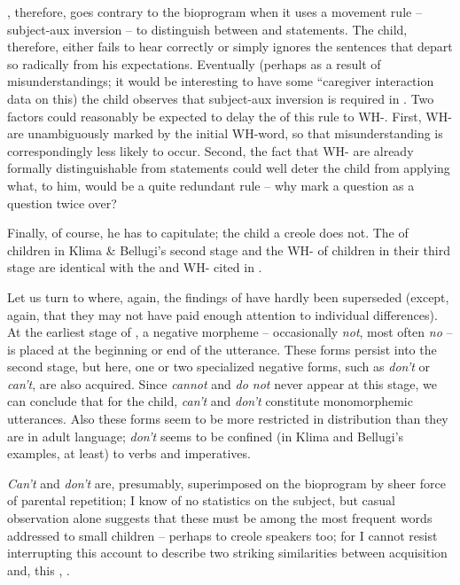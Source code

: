 , therefore, goes contrary to the bioprogram when it uses a movement rule -- subject-aux inversion -- to distinguish between  and statements. The child, therefore, either fails to hear correctly or simply ignores the sentences that depart so radically from his expectations. Eventually (perhaps as a result of misunderstandings; it would be interesting to have some ``caregiver interaction data on this) the child observes that subject-aux inversion is required in  . Two factors could reasonably be expected to delay the  of this rule to WH-. First, WH- are unambiguously marked by the initial WH-word, so that misunderstanding is correspondingly less likely to occur. Second, the fact that WH- are already formally distinguishable from statements could well deter the child from applying what, to him, would be a quite redundant rule -- why mark a question as a question twice over?

Finally, of course, he has to capitulate; the child  a creole does not. The   of children in Klima \& Bellugi's
second stage and the WH- of children in their third stage are identical with the  and WH- cited in .

Let us turn to  where, again, the findings of \citet{KlimaEtAl1966} have hardly been superseded (except, again, that they may not have paid enough attention to individual differences). At the earliest stage of , a negative morpheme -- occasionally \textit{not}, most often \textit{no} -- is placed at the beginning or end of the utterance. These forms persist into the second stage, but here, one or two specialized negative forms, such as \textit{don't} or \textit{can't}, are also acquired. Since \textit{cannot} and \textit{do not} never appear at this stage, we can conclude that for the child, \textit{can't} and \textit{don't} constitute monomorphemic utterances. Also these forms seem to be more restricted in distribution than they are in adult language; \textit{don't} seems to be confined (in Klima and Bellugi's examples, at least) to  verbs and imperatives.

\textit{Can't} and \textit{don't} are, presumably, superimposed on the bioprogram by sheer force of parental repetition; I know of no statistics on the subject, but casual observation alone suggests that these must be among the most frequent words addressed to small children -- perhaps to creole speakers too; for I cannot resist interrupting this account to describe two striking similarities between acquisition and, this , .\\\\

